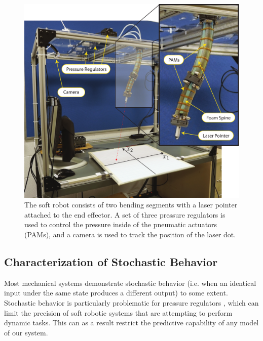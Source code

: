 \begin{figure}
    \centering
    \includegraphics[width=\linewidth]{figures/rig_N_robot_smaller.pdf}
    \caption{The soft robot consists of two bending segments with a laser pointer attached to the end effector. A set of three pressure regulators is used to control the pressure inside of the pneumatic actuators (PAMs), and a camera is used to track the position of the laser dot.}
    \label{fig:rig}
\end{figure}

\subsection{Characterization of Stochastic Behavior}
\label{sec:noise}

Most mechanical systems demonstrate stochastic behavior (i.e. when an identical input under the same state produces a different output) to some extent.
Stochastic behavior is particularly problematic for pressure regulators , which can limit the precision of soft robotic systems that are attempting to perform dynamic tasks.
This can as a result restrict the predictive capability of any model of our system.


